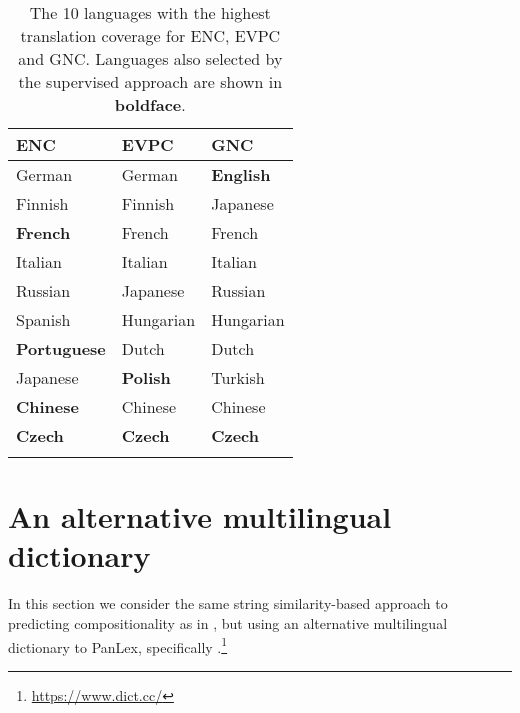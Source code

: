 \documentclass[output=paper
,modfonts
,nonflat]{langsci/langscibook}
\begin{document}
\begin{table}[t]
\begin{center}
\begin{tabular}{l l l } \lsptoprule

ENC&EVPC&GNC\\
\midrule
German & German & \textbf{English}\\
Finnish  & Finnish & Japanese\\
\textbf{French}& French & French\\
Italian& Italian & Italian\\
Russian&  Japanese & Russian\\
Spanish & Hungarian & Hungarian\\
\textbf{Portuguese} & Dutch & Dutch\\
Japanese& \textbf{Polish}&  Turkish\\
\textbf{Chinese} & Chinese & Chinese\\
\textbf{Czech}&  \textbf{Czech} &\textbf{Czech}\\
\lspbottomrule

\end{tabular}

\end{center}
\caption{\label{tab:ss:cov} The 10 languages with the highest
  translation coverage for ENC, EVPC and GNC. Languages also selected
  by the supervised approach are shown in \textbf{boldface}.}
\end{table}




\section{An alternative multilingual dictionary\label{sec:dictcc}}

In this section we consider the same string similarity-based approach
to predicting compositionality as in , but
using an alternative multilingual dictionary to PanLex, specifically
\dictcc.\footnote{\url{https://www.dict.cc/}}

\end{document}
